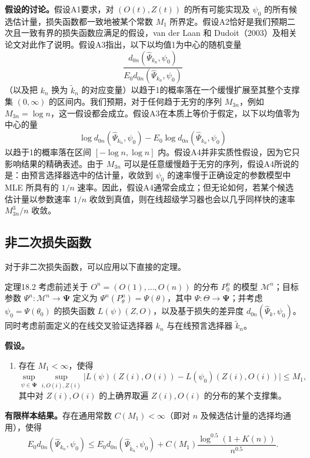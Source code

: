 \noindent\textbf{假设的讨论。}假设A1要求，对 $(O(t),Z(t))$ 的所有可能实现及 $\psi_0$ 的所有候选估计量，损失函数都一致地被某个常数 $M_1$ 所界定。假设A2恰好是我们预期二次且一致有界的损失函数应满足的假设，van der Laan 和 Dudoit（2003）及相关论文对此作了说明。假设A3指出，以下以均值1为中心的随机变量
\[
 \frac{d_{0n}(\widehat\Psi_{k_n},\psi_0)}
 {E_0d_{0n}(\widehat\Psi_{k_n},\psi_0)}
\]
（以及把 $k_n$ 换为 $\widetilde k_n$ 的对应变量）以趋于1的概率落在一个缓慢扩展至其整个支撑集 $(0,\infty)$ 的区间内。我们预期，对于任何趋于无穷的序列 $M_{3n}$，例如 $M_{3n}=\log n$，这一假设都会成立。假设A3在本质上等价于假定，以下以均值零为中心的量
\[
 \log d_{0n}(\widehat\Psi_{k_n},\psi_0)
 -E_0\log d_{0n}(\widehat\Psi_{k_n},\psi_0)
\]
以趋于1的概率落在区间 $[-\log n,\log n]$ 内。假设A4并非实质性假设，因为它只影响结果的精确表述。由于 $M_{3n}$ 可以是任意缓慢趋于无穷的序列，假设A4所说的是：由预言选择器选中的估计量，收敛到 $\psi_0$ 的速率慢于正确设定的参数模型中 MLE 所具有的 $1/n$ 速率。因此，假设A4通常会成立；但无论如何，若某个候选估计量以参数速率 $1/n$ 收敛到真值，则在线超级学习器也会以几乎同样快的速率 $M_{3n}^3/n$ 收敛。

\subsection{非二次损失函数}

对于非二次损失函数，可以应用以下直接的定理。

\begin{bookresult}{定理}{18.2}
考虑前述关于 $O^n=(O(1),\ldots,O(n))$ 的分布 $P_0^n$ 的模型 $\mathcal M^n$；目标参数 $\Psi^n:\mathcal M^n\to\bm{\Psi}$ 定义为 $\Psi^n(P_\theta^n)=\Psi(\theta)$，其中 $\Psi:\Theta\to\bm{\Psi}$；并考虑 $\psi_0=\Psi(\theta_0)$ 的损失函数 $L(\psi)(Z,O)$，以及基于损失的差异度 $d_{0n}(\widehat\Psi_k,\psi_0)$。同时考虑前面定义的在线交叉验证选择器 $k_n$ 与在线预言选择器 $\widetilde k_n$。

\noindent\textbf{假设。}
\begin{enumerate}[label=A\arabic*.,leftmargin=2.8em]
\item 存在 $M_1<\infty$，使得
\[
 \sup_{\psi\in\bm{\Psi}}\sup_{i,O(i),Z(i)}
 \bigl|L(\psi)(Z(i),O(i))-L(\psi_0)(Z(i),O(i))\bigr|\le M_1,
\]
其中对 $Z(i),O(i)$ 的上确界取遍 $Z(i),O(i)$ 的分布的某个支撑集。
\end{enumerate}

\noindent\textbf{有限样本结果。}存在通用常数 $C(M_1)<\infty$（即对 $n$ 及候选估计量的选择均通用），使得
\[
 E_0d_{0n}(\widehat\Psi_{k_n},\psi_0)
 \le E_0d_{0n}(\widehat\Psi_{\widetilde k_n},\psi_0)
 +C(M_1)\frac{\log^{0.5}(1+K(n))}{n^{0.5}}.
\]
\end{bookresult}
